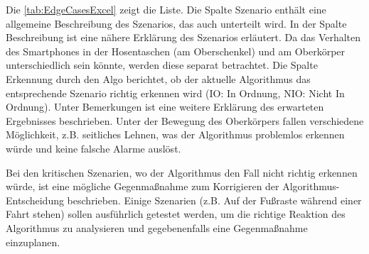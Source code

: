 Die \autoref{tab:EdgeCasesExcel} zeigt die Liste. Die Spalte \glqq Szenario\grqq{} enthält eine allgemeine Beschreibung des Szenarios, das auch unterteilt wird. In der Spalte \glqq Beschreibung\grqq{} ist eine nähere Erklärung des Szenarios erläutert.
Da das Verhalten des Smartphones in der Hosentaschen (am Oberschenkel) und am Oberkörper unterschiedlich sein könnte, werden diese separat betrachtet.
Die Spalte \glqq Erkennung durch den Algo\grqq{} berichtet, ob der aktuelle Algorithmus das entsprechende Szenario richtig erkennen wird (IO: In Ordnung, NIO: Nicht In Ordnung). Unter \glqq Bemerkungen\grqq{} ist eine weitere Erklärung des erwarteten Ergebnisses beschrieben. 
Unter der Bewegung des Oberkörpers fallen verschiedene Möglichkeit, z.B. seitliches Lehnen, was der Algorithmus problemlos erkennen würde und keine falsche Alarme auslöst.

Bei den kritischen Szenarien, wo der Algorithmus den Fall nicht richtig erkennen würde, ist eine mögliche Gegenmaßnahme zum Korrigieren der Algo\-rithmus-Ent\-scheid\-ung beschrieben.
Einige Szenarien (z.B. Auf der Fußraste während einer Fahrt stehen) sollen ausführlich getestet werden, um die richtige Reaktion des Algorithmus zu analysieren und gegebenenfalls eine Gegenmaßnahme einzuplanen.

